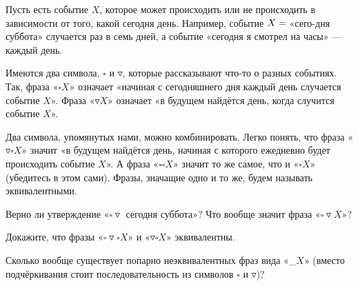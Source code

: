 ﻿
\noindent Пусть есть событие $X$, которое может происходить или не происходить в зависимости от того, какой сегодня день. Например, событие $X = \vphantom{x}$«сего-\linebreak дня суббота» случается раз в семь дней, а событие «сегодня я смотрел на часы» — каждый день. 

\def\sq{\square}
\def\td{\triangledown}
\ms Имеются два символа, $\square$ и $\triangledown$, которые рассказывают что-то о разных событиях. Так, фраза «$\sq X$» означает «начиная с сегодняшнего дня каждый день случается событие $X$». Фраза «$\td X$» означает «в будущем найдётся день, когда случится событие $X$».

\ms Два символа, упомянутых нами, можно комбинировать. Легко понять, что фраза «$\td\sq X$» значит «в будущем найдётся день, начиная с которого ежедневно будет происходить событие $X$». А фраза «$\sq\sq X$» значит то же самое, что и «$\sq X$» (убедитесь в этом сами). Фразы, значащие одно и то же, будем называть эквивалентными.

\begin{enumerate}
\itA Верно ли утверждение «$\sq\td \text{ сегодня суббота}$»? Что вообще значит фраза «$\sq\td X$»?

\itB Докажите, что фразы «$\sq\td\sq X$» и «$\td\sq X$» эквивалентны.

\itC Сколько вообще существует попарно неэквивалентных фраз вида «\_$X$» (вместо подчёркивания стоит последовательность из символов $\sq$ и $\td$)?
\end{enumerate}